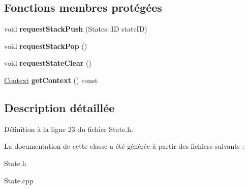 \subsection*{Fonctions membres protégées}
\begin{DoxyCompactItemize}
\item 
\hypertarget{class_state_a6763de833ceb9c23df45aff163a4a1cd}{}\label{class_state_a6763de833ceb9c23df45aff163a4a1cd} 
void {\bfseries request\+Stack\+Push} (States\+::\+ID state\+ID)
\item 
\hypertarget{class_state_aa418660892d6161772c907bd8d70f910}{}\label{class_state_aa418660892d6161772c907bd8d70f910} 
void {\bfseries request\+Stack\+Pop} ()
\item 
\hypertarget{class_state_a4b602bed9bf0179ee5f6748fce340ae6}{}\label{class_state_a4b602bed9bf0179ee5f6748fce340ae6} 
void {\bfseries request\+State\+Clear} ()
\item 
\hypertarget{class_state_a93a72915d1aad6d8f7eacc81094dc920}{}\label{class_state_a93a72915d1aad6d8f7eacc81094dc920} 
\hyperlink{struct_state_1_1_context}{Context} {\bfseries get\+Context} () const
\end{DoxyCompactItemize}


\subsection{Description détaillée}


Définition à la ligne 23 du fichier State.\+h.



La documentation de cette classe a été générée à partir des fichiers suivants \+:\begin{DoxyCompactItemize}
\item 
State.\+h\item 
State.\+cpp\end{DoxyCompactItemize}
